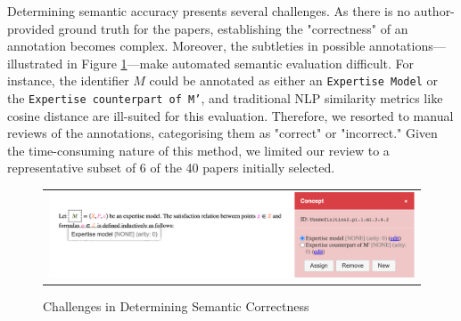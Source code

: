 Determining semantic accuracy presents several challenges. As there is no author-provided ground truth for the papers, establishing the "correctness" of an annotation becomes complex. Moreover, the subtleties in possible annotations—illustrated in Figure \ref{fig:semantic-incorrectness}—make automated semantic evaluation difficult. For instance, the identifier $\mathbf{}{M}$ could be annotated as either an \texttt{Expertise Model} or the \texttt{Expertise counterpart of M'}, and traditional NLP similarity metrics like cosine distance are ill-suited for this evaluation. Therefore, we resorted to manual reviews of the annotations, categorising them as "correct" or "incorrect." Given the time-consuming nature of this method, we limited our review to a representative subset of 6 of the 40 papers initially selected.

\begin{figure}[htpb]
  \centering
  \begin{tabular}{c}
    \includegraphics[width=14cm]{images/semantic-incorrectness.png}
  \end{tabular}
  \caption[Semantic Correctness]{Challenges in Determining Semantic Correctness}\label{fig:semantic-incorrectness}
\end{figure}
